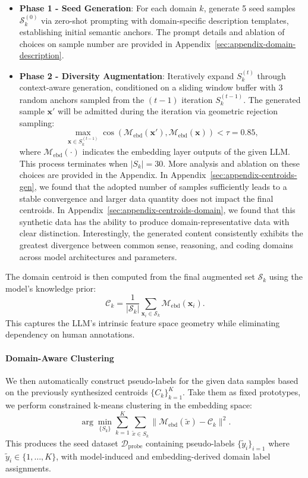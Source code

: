 \begin{itemize}[leftmargin=*]
\item \textbf{Phase 1 - Seed Generation}: For each domain $k$, generate 5 seed samples $\mathcal{S}_k^{(0)}$ via zero-shot prompting with domain-specific description templates, establishing initial semantic anchors. The prompt details and ablation of choices on sample number are provided in Appendix~\ref{sec:appendix-domain-description}.

\item \textbf{Phase 2 - Diversity Augmentation}: Iteratively expand \( S_k^{(t)} \) through context-aware generation, conditioned on a sliding window buffer with 3 random anchors sampled from the $(t-1)$ iteration \( S_k^{(t-1)} \). 
The generated sample \( \mathbf{x'} \) will be admitted during the iteration via geometric rejection sampling:
\begin{equation}
    \max_{\mathbf{x} \in S_k^{(t-1)}} \cos(\mathcal{M}_{\text{ebd}}(\mathbf{x'}), \mathcal{M}_{\text{ebd}}(\mathbf{x})) < \tau = 0.85,
\end{equation}
where $\mathcal{M}_\text{ebd}(\cdot) $ indicates the embedding layer outputs of the given LLM. This process terminates when \( |S_k| = 30 \).
More analysis and ablation on these choices are provided in the Appendix. 
In Appendix~\ref{sec:appendix-centroids-gen}, we found that the adopted number of samples sufficiently leads to a stable convergence and larger data quantity does not impact the final centroids.
In Appendix~\ref{sec:appendix-centroids-domain}, we found that this synthetic data has the ability to produce domain-representative data with clear distinction. Interestingly, the generated content consistently exhibits the greatest divergence between common sense, reasoning, and coding domains across model architectures and parameters.
\end{itemize}

The domain centroid is then computed from the final augmented set $\mathcal{S}_k$ using the model's knowledge prior:
\begin{equation}
\mathcal{C}_k = \frac{1}{|\mathcal{S}_k|} \sum_{\mathbf{x}_i \in \mathcal{S}_k} \mathcal{M}_\text{ebd}(\mathbf{x}_i).
\end{equation} 
This captures the LLM's intrinsic feature space geometry while eliminating dependency on human annotations.

\paragraph{Domain-Aware Clustering} 
We then automatically construct pseudo-labels for the given data samples based on the previously synthesized centroids $\{C_k\}_{k=1}^K$. Take them as fixed prototypes, we perform constrained k-means clustering in the embedding space:
\begin{equation}
    \arg\min_{\{S_k\}} \sum_{k=1}^K \sum_{\tilde{x} \in S_k} \|\mathcal{M}_\text{ebd}(\tilde{x}) - \mathcal{C}_k\|^2.
\end{equation}
This produces the seed dataset $\mathcal{D}_{\text{probe}}$ containing 
pseudo-labels $\{\tilde{y}_i\}_{i=1}$ where $\tilde{y}_i \in \{1, \ldots, K\}$, with model-induced and embedding-derived domain label assignments.

